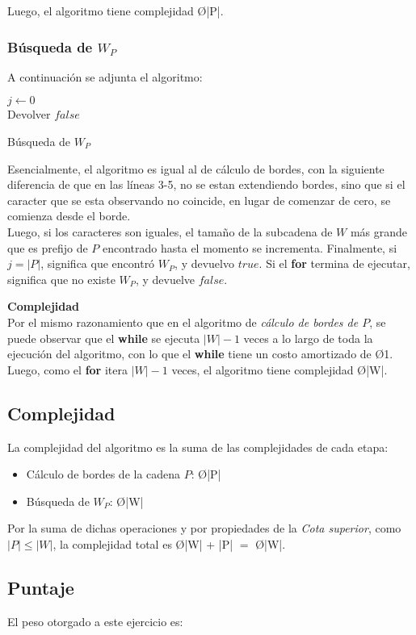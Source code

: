 Luego, el algoritmo tiene complejidad \O{|P|}.\\
\strut\hfill\qedsymbol

\subsubsection{Búsqueda de $W_P$}
A continuación se adjunta el algoritmo:\\
\begin{algorithm}[H]
 \DontPrintSemicolon
 $j \gets 0$\\
 Devolver $false$
 \caption{Búsqueda de $W_P$}
\end{algorithm}

Esencialmente, el algoritmo es igual al de cálculo de bordes, con la siguiente diferencia de que en las líneas 3-5, no se estan extendiendo bordes, sino que si el caracter que se esta observando no coincide, en lugar de comenzar de cero, se comienza desde el borde.\\
Luego, si los caracteres son iguales, el tamaño de la subcadena de $W$ más grande que es prefijo de $P$ encontrado hasta el momento se incrementa.
Finalmente, si $j = |P|$, significa que encontró $W_P$, y devuelvo $true$. Si el \textbf{for} termina de ejecutar, significa que no existe $W_P$, y devuelve $false$.

\textbf{Complejidad}\\
Por el mismo razonamiento que en el algoritmo de \emph{cálculo de bordes de $P$}, se puede observar que el \textbf{while} se ejecuta $|W|-1$ veces a lo largo de toda la ejecución del algoritmo, con lo que el \textbf{while} tiene un costo amortizado de \O{1}. Luego, como el \textbf{for} itera $|W|-1$ veces, el algoritmo tiene complejidad \O{|W|}.

\subsection{Complejidad}
La complejidad del algoritmo es la suma de las complejidades de cada etapa:
\begin{itemize}
	\item Cálculo de bordes de la cadena $P$: \O{|P|}
	\item Búsqueda de $W_P$: \O{|W|}
\end{itemize}

Por la suma de dichas operaciones y por propiedades de la \emph{Cota superior}, como $|P| \leq |W|$, la complejidad total es \O{|W| + |P|} $ = $ \O{|W|}.

\subsection{Puntaje}
El peso otorgado a este ejercicio es:
